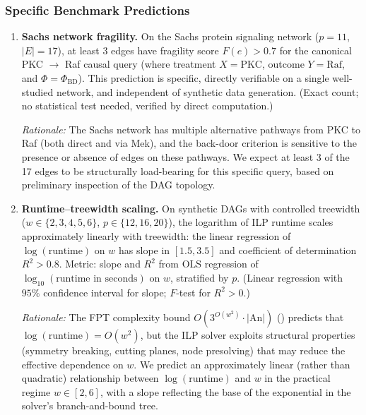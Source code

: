 \documentclass[11pt,a4paper]{article}
\theoremstyle{definition}
\theoremstyle{remark}
\newcommand{\An}{\mathrm{An}}
\newcommand{\fragility}{F}
\newcommand{\Phi}{\varPhi}
\begin{document}
\subsubsection{Specific Benchmark Predictions}

\begin{enumerate}[label=\textbf{P\arabic*:},resume]
\item \textbf{Sachs network fragility.} On the Sachs protein signaling
  network \cite{sachs2005} ($p = 11$, $|E| = 17$), at least 3 edges
  have fragility score $\fragility(e) > 0.7$ for the canonical
  PKC $\to$ Raf causal query (where treatment $X = \mathrm{PKC}$,
  outcome $Y = \mathrm{Raf}$, and $\Phi = \Phi_{\mathrm{BD}}$). This
  prediction is specific, directly verifiable on a single well-studied
  network, and independent of synthetic data generation. (Exact count;
  no statistical test needed, verified by direct computation.)

  \emph{Rationale:} The Sachs network has multiple alternative pathways
  from PKC to Raf (both direct and via Mek), and the back-door criterion
  is sensitive to the presence or absence of edges on these pathways. We
  expect at least 3 of the 17 edges to be structurally load-bearing for
  this specific query, based on preliminary inspection of the DAG
  topology.

\item \textbf{Runtime--treewidth scaling.} On synthetic DAGs with
  controlled treewidth ($w \in \{2, 3, 4, 5, 6\}$, $p \in
  \{12, 16, 20\}$), the logarithm of ILP runtime scales approximately
  linearly with treewidth: the linear regression of $\log(\text{runtime})$
  on $w$ has slope in $[1.5, 3.5]$ and coefficient of determination
  $R^2 > 0.8$. Metric: slope and $R^2$ from OLS regression of
  $\log_{10}(\text{runtime in seconds})$ on $w$, stratified by $p$.
  (Linear regression with $95\%$ confidence interval for slope;
  $F$-test for $R^2 > 0$.)

  \emph{Rationale:} The FPT complexity bound $O(3^{O(w^2)} \cdot |\An|)$
  () predicts that $\log(\text{runtime}) = O(w^2)$, but
  the ILP solver exploits structural properties (symmetry breaking,
  cutting planes, node presolving) that may reduce the effective
  dependence on $w$. We predict an approximately linear (rather than
  quadratic) relationship between $\log(\text{runtime})$ and $w$ in
  the practical regime $w \in [2, 6]$, with a slope reflecting the
  base of the exponential in the solver's branch-and-bound tree.
\end{enumerate}
\end{document}
